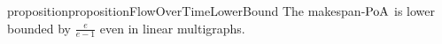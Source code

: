 \begin{restatable}{proposition}{propositionFlowOverTimeLowerBound}\label{prop_propositionFlowOverTimeLowerBound}
    The makespan-$\operatorname*{PoA}$ is lower bounded by $\frac{e}{e-1}$ even in linear multigraphs.
\end{restatable}


